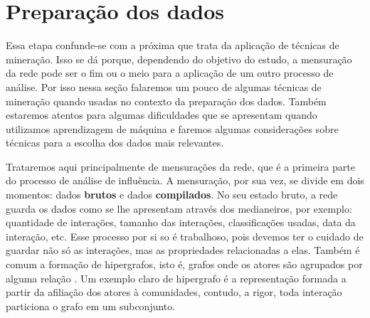 \chapter{Preparação dos dados}
\label{ch:preparacao}

Essa etapa confunde-se com a próxima que trata da aplicação de técnicas de
mineração. Isso se dá porque, dependendo do objetivo do estudo, a mensuração da
rede pode ser o fim ou o meio para a aplicação de um outro processo de análise.
Por isso nessa seção falaremos um pouco de algumas técnicas de mineração quando
usadas no contexto da preparação dos dados. Também estaremos atentos para
algumas dificuldades que se apresentam quando utilizamos aprendizagem de
máquina e faremos algumas considerações sobre técnicas para a escolha dos dados
mais relevantes.

Trataremos aqui principalmente de mensurações da rede, que é a primeira parte do
processo de análise de influência. A mensuração, por sua vez, se divide em dois
momentos: dados \textbf{brutos} e dados \textbf{compilados}. No seu estado bruto,
a rede guarda os dados como se lhe apresentam através dos medianeiros, por
exemplo: quantidade de interações, tamanho das interações, classificações usadas,
data da interação, etc. Esse processo por si so é trabalhoso, pois devemos ter o
cuidado de guardar não só as interações, mas as propriedades relacionadas a elas.
Também é comum a formação de hipergrafos, isto é, grafos onde os atores são
agrupados por alguma relação \citep{Breiger1974, Seidman1978}. Um exemplo
claro de hipergrafo é a representação formada a partir da afiliação dos atores à
comunidades, contudo, a rigor, toda interação particiona o grafo em um
subconjunto.
